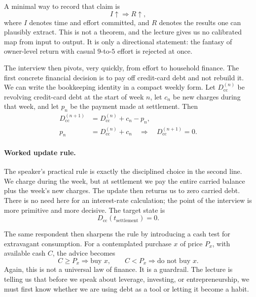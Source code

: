 A minimal way to record that claim is
\begin{equation}
I \uparrow \Longrightarrow R \uparrow,
\end{equation}
where \(I\) denotes time and effort committed, and \(R\) denotes the results one can plausibly extract. This is not a theorem, and the lecture gives us no calibrated map from input to output. It is only a directional statement: the fantasy of owner-level return with casual \(9\)-to-\(5\) effort is rejected at once.

The interview then pivots, very quickly, from effort to household finance. The first concrete financial decision is to pay off credit-card debt and not rebuild it. We can write the bookkeeping identity in a compact weekly form. Let \(D_{\mathrm{cc}}^{(n)}\) be revolving credit-card debt at the start of week \(n\), let \(c_n\) be new charges during that week, and let \(p_n\) be the payment made at settlement. Then
\begin{align}
D_{\mathrm{cc}}^{(n+1)} &= D_{\mathrm{cc}}^{(n)} + c_n - p_n, \\
p_n &= D_{\mathrm{cc}}^{(n)} + c_n
\quad \Longrightarrow \quad
D_{\mathrm{cc}}^{(n+1)} = 0.
\end{align}

\paragraph{Worked update rule.}
The speaker's practical rule is exactly the disciplined choice in the second line. We charge during the week, but at settlement we pay the entire carried balance plus the week's new charges. The update then returns us to zero carried debt. There is no need here for an interest-rate calculation; the point of the interview is more primitive and more decisive. The target state is
\begin{equation}
D_{\mathrm{cc}}(t_{\mathrm{settlement}})=0.
\end{equation}

The same respondent then sharpens the rule by introducing a cash test for extravagant consumption. For a contemplated purchase \(x\) of price \(P_x\), with available cash \(C\), the advice becomes
\begin{equation}
C \ge P_x \Rightarrow \text{buy }x,
\qquad
C < P_x \Rightarrow \text{do not buy }x.
\end{equation}
Again, this is not a universal law of finance. It is a guardrail. The lecture is telling us that before we speak about leverage, investing, or entrepreneurship, we must first know whether we are using debt as a tool or letting it become a habit.

